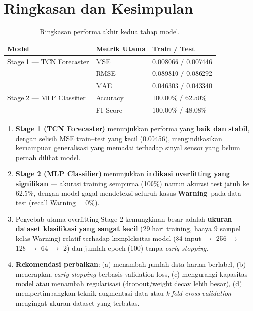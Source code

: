 \documentclass[11pt,a4paper]{article}
\newcommand{\warning}{\textcolor{orange!80!black}{\textbf{Warning}}}
\begin{document}
\newpage
\section{Ringkasan dan Kesimpulan}

\begin{table}[H]
    \centering
    \caption{Ringkasan performa akhir kedua tahap model.}
    \begin{tabular}{lll}
        \toprule
        \textbf{Model} & \textbf{Metrik Utama} & \textbf{Train / Test} \\
        \midrule
        Stage 1 — TCN Forecaster & MSE & 0.008066 / 0.007446 \\
                                  & RMSE & 0.089810 / 0.086292 \\
                                  & MAE & 0.046303 / 0.043340 \\
        Stage 2 — MLP Classifier & Accuracy & 100.00\% / 62.50\% \\
                                  & F1-Score & 100.00\% / 48.08\% \\
        \bottomrule
    \end{tabular}
\end{table}

\begin{enumerate}
    \item \textbf{Stage 1 (TCN Forecaster)} menunjukkan performa yang \textbf{baik dan stabil}, dengan selisih MSE train--test yang kecil (0.00456), mengindikasikan kemampuan generalisasi yang memadai terhadap sinyal sensor yang belum pernah dilihat model.
    \item \textbf{Stage 2 (MLP Classifier)} menunjukkan \textbf{indikasi overfitting yang signifikan} — akurasi training sempurna (100\%) namun akurasi test jatuh ke 62.5\%, dengan model gagal mendeteksi seluruh kasus \warning\ pada data test (recall Warning = 0\%).
    \item Penyebab utama overfitting Stage 2 kemungkinan besar adalah \textbf{ukuran dataset klasifikasi yang sangat kecil} (29 hari training, hanya 9 sampel kelas Warning) relatif terhadap kompleksitas model (84 input $\to$ 256 $\to$ 128 $\to$ 64 $\to$ 2) dan jumlah epoch (100) tanpa \textit{early stopping}.
    \item \textbf{Rekomendasi perbaikan}: (a) menambah jumlah data harian berlabel, (b) menerapkan \textit{early stopping} berbasis validation loss, (c) mengurangi kapasitas model atau menambah regularisasi (dropout/weight decay lebih besar), (d) mempertimbangkan teknik augmentasi data atau \textit{k-fold cross-validation} mengingat ukuran dataset yang terbatas.
\end{enumerate}
\end{document}
